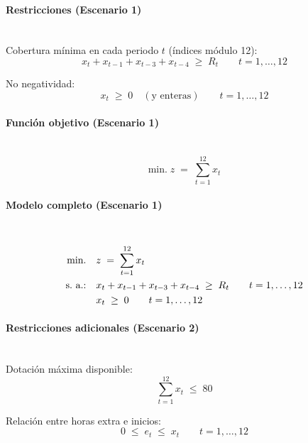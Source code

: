 \paragraph{Restricciones (Escenario 1)}\mbox{}\\
Cobertura mínima en cada periodo $t$ (índices módulo 12):
\begin{equation}
    x_t + x_{t-1} + x_{t-3} + x_{t-4} \;\geq\; R_t \qquad t=1,\dots,12
\end{equation}

\noindent No negatividad:
\begin{equation}
    x_t \;\geq\; 0 \quad (\text{y enteras}) \qquad t=1,\dots,12
\end{equation}

\paragraph{Función objetivo (Escenario 1)}\mbox{}\\
\begin{equation}
\mbox{min.}\; z \;=\; \sum_{t=1}^{12} x_t
\end{equation}

\paragraph{Modelo completo (Escenario 1)}\mbox{}\\
\begin{align}
\mbox{min.}\quad & z \;=\; \sum_{t=1}^{12} x_t \notag \\
\mbox{s.\ a.:}\quad 
& x_t + x_{t-1} + x_{t-3} + x_{t-4} \;\geq\; R_t \qquad t=1,\dots,12 \notag \\
& x_t \;\geq\; 0 \qquad t=1,\dots,12 \notag
\end{align}

\paragraph{Restricciones adicionales (Escenario 2)}\mbox{}\\
Dotación máxima disponible:
\begin{equation}
    \sum_{t=1}^{12} x_t \;\leq\; 80
\end{equation}

\noindent Relación entre horas extra e inicios:
\begin{equation}
    0 \;\leq\; e_t \;\leq\; x_t \qquad t=1,\dots,12
\end{equation}

